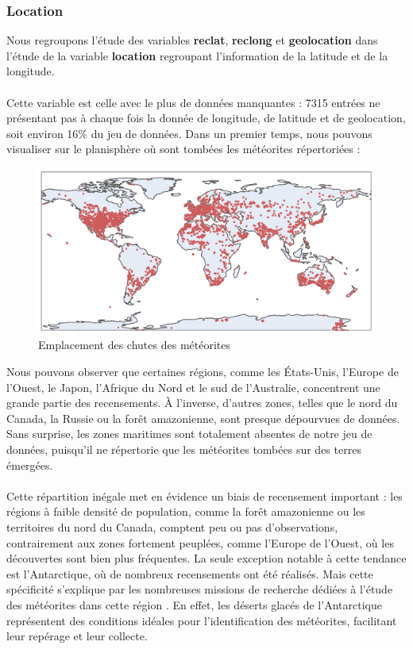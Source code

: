 \documentclass[12pt]{article}
\begin{document}
\subsubsection*{Location}
Nous regroupons l'étude des variables \textbf{reclat}, \textbf{reclong} et \textbf{geolocation} dans l'étude de la variable \textbf{location} regroupant l'information de la latitude et de la longitude.\\
\\
Cette variable est celle avec le plus de données manquantes : 7315 entrées ne présentant pas à chaque fois la donnée de longitude, de latitude et de geolocation, soit environ 16\% du jeu de données. Dans un premier temps, nous pouvons visualiser sur le planisphère où sont tombées les météorites répertoriées :\\
\begin{figure}[H]
\centering
\includegraphics[width=14cm]{Images/exploration/points_monde.png}
\caption{Emplacement des chutes des météorites}
\end{figure}
Nous pouvons observer que certaines régions, comme les États-Unis, l’Europe de l’Ouest, le Japon, l’Afrique du Nord et le sud de l’Australie, concentrent une grande partie des recensements. À l’inverse, d’autres zones, telles que le nord du Canada, la Russie ou la forêt amazonienne, sont presque dépourvues de données. Sans surprise, les zones maritimes sont totalement absentes de notre jeu de données, puisqu’il ne répertorie que les météorites tombées sur des terres émergées.\\
\\
Cette répartition inégale met en évidence un biais de recensement important : les régions à faible densité de population, comme la forêt amazonienne ou les territoires du nord du Canada, comptent peu ou pas d’observations, contrairement aux zones fortement peuplées, comme l’Europe de l’Ouest, où les découvertes sont bien plus fréquentes. La seule exception notable à cette tendance est l’Antarctique, où de nombreux recensements ont été réalisés. Mais cette spécificité s’explique par les nombreuses missions de recherche dédiées à l’étude des météorites dans cette région \cite{Mission_recherche_antartictique}. En effet, les déserts glacés de l’Antarctique représentent des conditions idéales pour l’identification des météorites, facilitant leur repérage et leur collecte.\\
\end{document}
